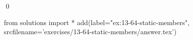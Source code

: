 
\begin{ex}
  \label{ex:13-64-static-members}
  
  \qed
\end{ex}
\begin{python0}
from solutions import *
add(label="ex:13-64-static-members",
    srcfilename='exercises/13-64-static-members/answer.tex')
\end{python0}
